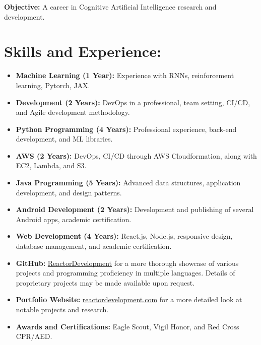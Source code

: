 \pagestyle{plain} 
\maketitle
\vspace{-0.4in}
\hspace*{-0.3in}
\textbf{Objective:} A career in Cognitive Artificial Intelligence research and development. 

\section*{Skills and Experience:}
\begin{itemize}
    \itemsep0em 
    \item \textbf{Machine Learning (1 Year):} Experience with RNNs, reinforcement learning, Pytorch, JAX.
    \item \textbf{Development (2 Years):} DevOps in a professional, team setting, CI/CD, and Agile development methodology. 
    \item \textbf{Python Programming (4 Years):} Professional experience, back-end development, and ML libraries.
    \item \textbf{AWS (2 Years):} DevOps, CI/CD through AWS Cloudformation, along with EC2, Lambda, and S3.
    \item \textbf{Java Programming (5 Years):} Advanced data structures, application development, and design patterns.
    \item \textbf{Android Development (2 Years):} Development and publishing of several Android apps, academic certification.
    \item \textbf{Web Development (4 Years):} React.js, Node.js, responsive design, database management, and academic certification.
    \item \textbf{GitHub:} \href{https://github.com/ReactorDevelopment}{ReactorDevelopment} for a more thorough 
        showcase of various projects and programming proficiency in multiple languages.  
        Details of proprietary projects may be made available upon request.
    \item \textbf{Portfolio Website:} \href{https://reactordevelopment.com}{reactordevelopment.com} for a 
        more detailed look at notable projects and research.
    \item \textbf{Awards and Certifications:} Eagle Scout, Vigil Honor, and Red Cross CPR/AED.
\end{itemize}

